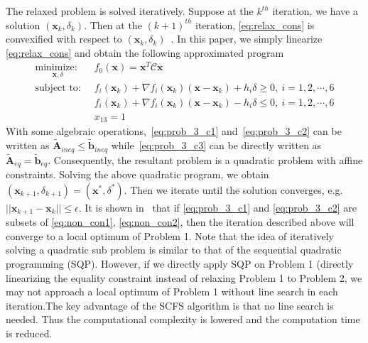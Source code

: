 \documentclass[a4paper]{report}
\begin{document}
The relaxed problem is solved iteratively. Suppose at the
$k^{th}$ iteration, we have a solution $(\mathbf{x}_{k}, \delta_k)$. Then at the $(k + 1)^{th}$ iteration, \eqref{eq:relax_cons} is convexified with respect to $(\mathbf{x}_{k}, \delta_k)$~\cite{liu2017real}. In this paper, we simply linearize \eqref{eq:relax_cons} and obtain the following approximated program
\begin{align}
\underset{\mathbf{x}, \delta}{\text{minimize: }}& \ f_0(\mathbf{x})=\mathbf{x}^T\mathcal{C}\mathbf{x}\\
\label{eq:prob_3_c1}
\text{subject to: }& \ f_i(\mathbf{x}_k) + \nabla f_i(\mathbf{x}_k)(\mathbf{x}-\mathbf{x}_k) + h_i\delta \geq 0,\ i=1,2,\cdots,6  \\
\label{eq:prob_3_c2}
& \ f_i(\mathbf{x}_k) + \nabla f_i(\mathbf{x}_k)(\mathbf{x}-\mathbf{x}_k) - h_i\delta \leq 0,\ i=1,2,\cdots,6  \\  
\label{eq:prob_3_c3}
& \ x_{13} = 1 
\end{align}
With some algebraic operations,~\eqref{eq:prob_3_c1} and~\eqref{eq:prob_3_c2} can be written as $\tilde{\mathbf{A}}_{ineq} \leq \tilde{\mathbf{b}}_{ineq}$ while~\eqref{eq:prob_3_c3} can be directly written as $\tilde{\mathbf{A}}_{eq} = \tilde{\mathbf{b}}_{eq}$. Consequently, the resultant problem is a quadratic problem with affine constraints. Solving the above quadratic program, we obtain $(\mathbf{x}_{k+1}, \delta_{k+1})=(\mathbf{x}^*, \delta^*)$. Then we iterate until the solution converges, e.g. $||\mathbf{x}_{k+1}-\mathbf{x}_k|| \leq \epsilon $. It is shown in~\cite{liu2017real} that if \eqref{eq:prob_3_c1} and \eqref{eq:prob_3_c2} are subsets of \eqref{eq:non_con1}, \eqref{eq:non_con2}, then the iteration described above will converge to
a local optimum of Problem 1. Note that the idea of iteratively solving a quadratic sub problem is similar to that of the sequential quadratic programming (SQP). However, if we directly apply SQP on Problem 1 (directly linearizing the equality constraint instead of relaxing Problem 1 to Problem 2, we may not approach a local optimum of Problem 1 without line search in each iteration.The key advantage of the SCFS algorithm is that no line search is needed. Thus the computational complexity is lowered and the computation time is reduced.
\end{document}
